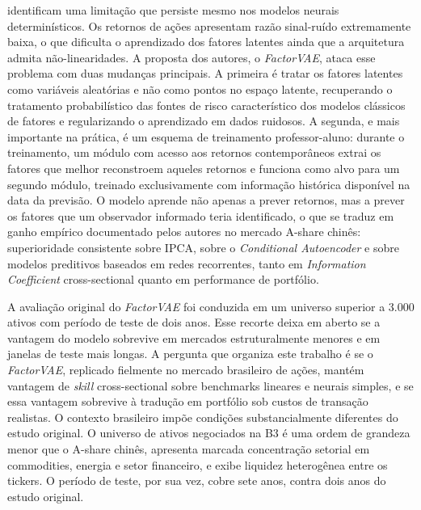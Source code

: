 \textcite{duan2022} identificam uma limitação que persiste mesmo nos modelos neurais
determinísticos. Os retornos de ações apresentam razão sinal-ruído extremamente baixa, o
que dificulta o aprendizado dos fatores latentes ainda que a arquitetura admita
não-linearidades. A proposta dos autores, o \textit{FactorVAE}, ataca esse problema com
duas mudanças principais. A primeira é tratar os fatores latentes como variáveis
aleatórias e não como pontos no espaço latente, recuperando o tratamento probabilístico
das fontes de risco característico dos modelos clássicos de fatores e regularizando o
aprendizado em dados ruidosos. A segunda, e mais importante na prática, é um esquema de
treinamento professor-aluno: durante o treinamento, um módulo com acesso aos retornos
contemporâneos extrai os fatores que melhor reconstroem aqueles retornos e funciona como
alvo para um segundo módulo, treinado exclusivamente com informação histórica disponível
na data da previsão. O modelo aprende não apenas a prever retornos, mas a prever os
fatores que um observador informado teria identificado, o que se traduz em ganho
empírico documentado pelos autores no mercado A-share chinês: superioridade consistente
sobre IPCA, sobre o \textit{Conditional Autoencoder} e sobre modelos preditivos baseados
em redes recorrentes, tanto em \textit{Information Coefficient} cross-sectional quanto em
performance de portfólio.

A avaliação original do \textit{FactorVAE} foi conduzida em um universo superior a 3.000
ativos com período de teste de dois anos. Esse recorte deixa em aberto se a vantagem do
modelo sobrevive em mercados estruturalmente menores e em janelas de teste mais longas.
A pergunta que organiza este trabalho é se o \textit{FactorVAE}, replicado fielmente no
mercado brasileiro de ações, mantém vantagem de \textit{skill} cross-sectional sobre
benchmarks lineares e neurais simples, e se essa vantagem sobrevive à tradução em
portfólio sob custos de transação realistas. O contexto brasileiro impõe condições
substancialmente diferentes do estudo original. O universo de ativos negociados na B3 é
uma ordem de grandeza menor que o A-share chinês, apresenta marcada concentração
setorial em commodities, energia e setor financeiro, e exibe liquidez heterogênea entre
os tickers. O período de teste, por sua vez, cobre sete anos, contra dois anos do
estudo original.

